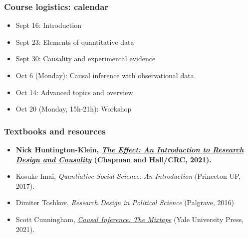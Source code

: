\documentclass[aspectratio=43]{beamer}
\begin{document}
\begin{frame}
\frametitle{Course logistics: calendar}
\centering

\begin{itemize}
  \item Sept 16: Introduction
  \item Sept 23: Elements of quantitative data
  \item Sept 30: Causality and experimental evidence
  \item Oct 6 (Monday): Causal inference with observational data
  \item Oct 14: Advanced topics and overview
  \item Oct 20 (Monday, 15h-21h): Workshop
\end{itemize}

\end{frame}

\begin{frame}
\frametitle{Textbooks and resources}
\centering

\begin{itemize}
  \item \textbf{Nick Huntington-Klein, \href{https://theeffectbook.net/}{\textit{The Effect: An Introduction to Research Design and Causality}} (Chapman and Hall/CRC, 2021).}
  \item Kosuke Imai, \textit{Quantiative Social Science: An Introduction} (Princeton UP, 2017).
  \item Dimiter Toshkov, \textit{Research Design in Political Science} (Palgrave, 2016)
  \item Scott Cunningham, \href{https://mixtape.scunning.com/}{\textit{Causal Inference: The Mixtape}} (Yale University Press, 2021).
\end{itemize}

\end{frame}
\end{document}
